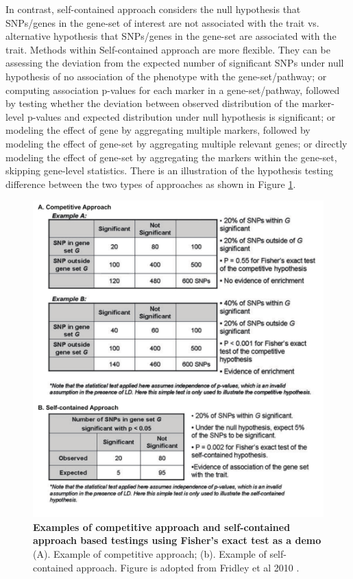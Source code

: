 \documentclass[12pt]{article}
\begin{document}
In contrast, self-contained approach considers the null hypothesis that SNPs/genes in the gene-set of interest are not associated with the trait vs. alternative hypothesis that SNPs/genes in the gene-set are associated with the trait. Methods within Self-contained approach are more flexible. They can be assessing the deviation from the expected number of significant SNPs under null hypothesis of no association of the phenotype with the gene-set/pathway; or computing association p-values for each marker in a gene-set/pathway, followed by testing whether the deviation between observed distribution of the marker-level p-values and expected distribution under null hypothesis is significant; or modeling the effect of gene by aggregating multiple markers, followed by modeling the effect of gene-set by aggregating multiple relevant genes; or directly modeling the effect of gene-set by aggregating the markers within the gene-set, skipping gene-level statistics. There is an illustration of the hypothesis testing difference between the two types of approaches as shown in Figure \ref{fig: CompetitiveVsConstrained}.

\begin{figure}[H]
\centering
\includegraphics[scale=0.5]{CompetitiveVsConstrained_illustration_example}

\caption{ \textbf{Examples of competitive approach and self-contained approach based testings using Fisher's exact test as a demo} (A). Example of competitive approach; (b). Example of self-contained approach. Figure is adopted from Fridley et al 2010 \cite{Fridley2011}. \label{fig: CompetitiveVsConstrained}}
\end{figure}
\end{document}
